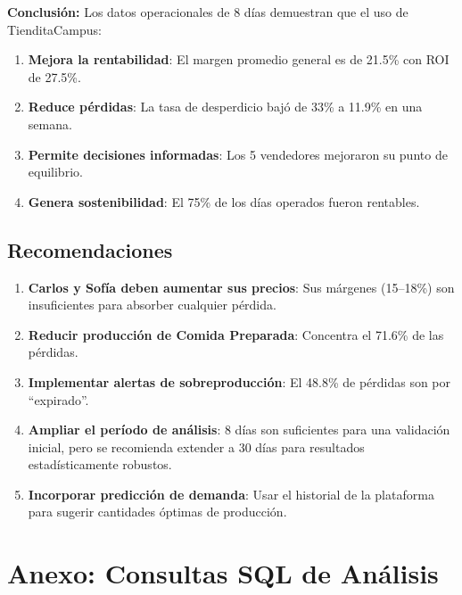 \documentclass[12pt,letterpaper]{article}
\begin{document}
\vspace{0.5cm}

\textbf{Conclusión:} Los datos operacionales de 8 días demuestran que el uso de TienditaCampus:

\begin{enumerate}[leftmargin=2em]
    \item \textbf{Mejora la rentabilidad}: El margen promedio general es de 21.5\% con ROI de 27.5\%.
    \item \textbf{Reduce pérdidas}: La tasa de desperdicio bajó de 33\% a 11.9\% en una semana.
    \item \textbf{Permite decisiones informadas}: Los 5 vendedores mejoraron su punto de equilibrio.
    \item \textbf{Genera sostenibilidad}: El 75\% de los días operados fueron rentables.
\end{enumerate}

\subsection{Recomendaciones}

\begin{enumerate}[leftmargin=2em]
    \item \textbf{Carlos y Sofía deben aumentar sus precios}: Sus márgenes (15--18\%) son insuficientes para absorber cualquier pérdida.
    \item \textbf{Reducir producción de Comida Preparada}: Concentra el 71.6\% de las pérdidas.
    \item \textbf{Implementar alertas de sobreproducción}: El 48.8\% de pérdidas son por ``expirado''.
    \item \textbf{Ampliar el período de análisis}: 8 días son suficientes para una validación inicial, pero se recomienda extender a 30 días para resultados estadísticamente robustos.
    \item \textbf{Incorporar predicción de demanda}: Usar el historial de la plataforma para sugerir cantidades óptimas de producción.
\end{enumerate}

\newpage
\section{Anexo: Consultas SQL de Análisis}
\end{document}
